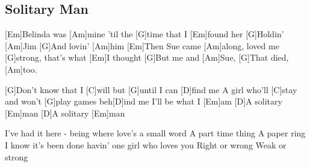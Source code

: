 \subsection*{Solitary Man   }



\begin{guitar}

[Em]Belinda was [Am]mine 'til the [G]time that I [Em]found her
[G]Holdin' [Am]Jim
[G]And lovin' [Am]him
[Em]Then Sue came [Am]along, loved me [G]strong, that's what [Em]I thought
[G]But me and [Am]Sue,
[G]That died, [Am]too.


[G]Don't know that I [C]will but [G]until I can [D]find me
A girl who'll [C]stay and won't [G]play games beh[D]ind me
I'll be what I [Em]am
[D]A solitary [Em]man
[D]A solitary [Em]man


I've had it here - being where love's a small word
A part time thing
A paper ring
I know it's been done havin' one girl who loves you
Right or wrong
Weak or strong
\end{guitar}
